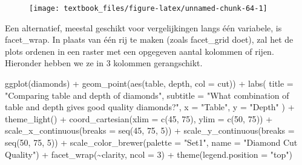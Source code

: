 \documentclass[]{tufte-book}
\newenvironment{Shaded}{}{}
\newcommand{\AttributeTok}[1]{\textcolor[rgb]{0.49,0.56,0.16}{#1}}
\newcommand{\DecValTok}[1]{\textcolor[rgb]{0.25,0.63,0.44}{#1}}
\newcommand{\FunctionTok}[1]{\textcolor[rgb]{0.02,0.16,0.49}{#1}}
\newcommand{\NormalTok}[1]{#1}
\newcommand{\SpecialCharTok}[1]{\textcolor[rgb]{0.25,0.44,0.63}{#1}}
\newcommand{\StringTok}[1]{\textcolor[rgb]{0.25,0.44,0.63}{#1}}
\begin{document}
\begin{figure}
\texttt{[image: textbook\_files/figure-latex/unnamed-chunk-64-1]} \end{figure}

Een alternatief, meestal geschikt voor vergelijkingen langs één variabele, is facet\_wrap. In plaats van één rij te maken (zoals facet\_grid doet), zal het de plots ordenen in een raster met een opgegeven aantal kolommen of rijen. Hieronder hebben we ze in 3 kolommen gerangschikt.

\begin{Shaded}
\begin{Highlighting}[]
\FunctionTok{ggplot}\NormalTok{(diamonds) }\SpecialCharTok{+}
  \FunctionTok{geom\_point}\NormalTok{(}\FunctionTok{aes}\NormalTok{(table, depth, }\AttributeTok{col =}\NormalTok{ cut)) }\SpecialCharTok{+}
  \FunctionTok{labs}\NormalTok{(}
    \AttributeTok{title =} \StringTok{"Comparing table and depth of diamonds"}\NormalTok{,}
    \AttributeTok{subtitle =} \StringTok{"What combination of table and depth gives good quality diamonds?"}\NormalTok{,}
    \AttributeTok{x =} \StringTok{"Table"}\NormalTok{,}
    \AttributeTok{y =} \StringTok{"Depth"}
\NormalTok{  ) }\SpecialCharTok{+}
  \FunctionTok{theme\_light}\NormalTok{() }\SpecialCharTok{+}
  \FunctionTok{coord\_cartesian}\NormalTok{(}\AttributeTok{xlim =} \FunctionTok{c}\NormalTok{(}\DecValTok{45}\NormalTok{, }\DecValTok{75}\NormalTok{), }\AttributeTok{ylim =} \FunctionTok{c}\NormalTok{(}\DecValTok{50}\NormalTok{, }\DecValTok{75}\NormalTok{)) }\SpecialCharTok{+}
  \FunctionTok{scale\_x\_continuous}\NormalTok{(}\AttributeTok{breaks =} \FunctionTok{seq}\NormalTok{(}\DecValTok{45}\NormalTok{, }\DecValTok{75}\NormalTok{, }\DecValTok{5}\NormalTok{)) }\SpecialCharTok{+}
  \FunctionTok{scale\_y\_continuous}\NormalTok{(}\AttributeTok{breaks =} \FunctionTok{seq}\NormalTok{(}\DecValTok{50}\NormalTok{, }\DecValTok{75}\NormalTok{, }\DecValTok{5}\NormalTok{)) }\SpecialCharTok{+}
  \FunctionTok{scale\_color\_brewer}\NormalTok{(}\AttributeTok{palette =} \StringTok{"Set1"}\NormalTok{, }\AttributeTok{name =} \StringTok{"Diamond Cut Quality"}\NormalTok{) }\SpecialCharTok{+}
  \FunctionTok{facet\_wrap}\NormalTok{(}\SpecialCharTok{\textasciitilde{}}\NormalTok{clarity, }\AttributeTok{ncol =} \DecValTok{3}\NormalTok{) }\SpecialCharTok{+}
  \FunctionTok{theme}\NormalTok{(}\AttributeTok{legend.position =} \StringTok{"top"}\NormalTok{)}
\end{Highlighting}
\end{Shaded}
\end{document}
